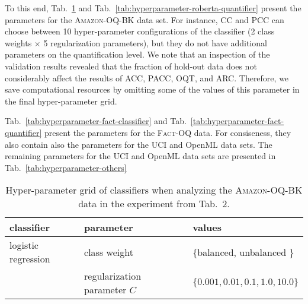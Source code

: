 \documentclass[10pt,a4paper]{article}
\begin{document}
To this end, Tab.~\ref{tab:hyperparameter-roberta-classifier} and Tab.~\ref{tab:hyperparameter-roberta-quantifier} present the parameters for the \textsc{Amazon-OQ-BK} data set. For instance, CC and PCC can choose between 10 hyper-parameter configurations of the classifier (2 class weights $\times$ 5 regularization parameters), but they do not have additional parameters on the quantification level. We note that an inspection of the validation results revealed that the fraction of hold-out data does not considerably affect the results of ACC, PACC, OQT, and ARC. Therefore, we save computational resources by omitting some of the values of this parameter in the final hyper-parameter grid.

Tab.~\ref{tab:hyperparameter-fact-classifier} and Tab.~\ref{tab:hyperparameter-fact-quantifier} present the parameters for the \textsc{Fact-OQ} data. For consiseness, they also contain also the parameters for the UCI and OpenML data sets. The remaining parameters for the UCI and OpenML data sets are presented in Tab.~\ref{tab:hyperparameter-others}

\begin{table}
  \centering
  \caption{Hyper-parameter grid of classifiers when analyzing the \textsc{Amazon-OQ-BK} data in the experiment from Tab.~2.}
  \label{tab:hyperparameter-roberta-classifier}
  \footnotesize
  \begin{tabular}{lll}
    \toprule
    classifier & parameter & values \\
    \midrule
    logistic regression & class weight & \{balanced, unbalanced \} \\
    & regularization parameter $C$ & $\{0.001, 0.01, 0.1, 1.0, 10.0\}$ \\
    \bottomrule
  \end{tabular}
\end{table}
\end{document}
